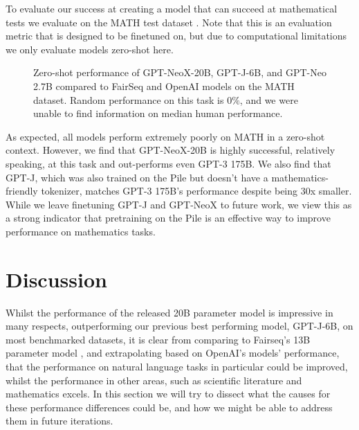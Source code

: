 \documentclass{article}
\newcommand{\model}{GPT-NeoX-20B}
\begin{document}
To evaluate our success at creating a model that can succeed at mathematical tests we evaluate on the MATH test dataset \citep{hendrycks2021measuring}. Note that this is an evaluation metric that is designed to be finetuned on, but due to computational limitations we only evaluate models zero-shot here.

\begin{figure}
    \centering
    \pgfplotsset{width=0.49\linewidth}
    
    \caption{Zero-shot performance of \model{}, GPT-J-6B, and GPT-Neo 2.7B compared to FairSeq and OpenAI models on the MATH dataset. Random performance on this task is $0\%$, and we were unable to find information on median human performance.}
    \label{fig:my_label}
\end{figure}


As expected, all models perform extremely poorly on MATH in a zero-shot context. However, we find that \model{} is highly successful, relatively speaking, at this task and out-performs even GPT-3 175B. We also find that GPT-J, which was also trained on the Pile but doesn't have a mathematics-friendly tokenizer, matches GPT-3 175B's performance despite being 30x smaller. While we leave finetuning GPT-J and GPT-NeoX to future work, we view this as a strong indicator that pretraining on the Pile is an effective way to improve performance on mathematics tasks.

\section{Discussion}

Whilst the performance of the released 20B parameter model is impressive in many respects, outperforming our previous best performing model, GPT-J-6B, on most benchmarked datasets, it is clear from comparing to Fairseq's 13B parameter model \citep{fairseq-13B}, and extrapolating based on OpenAI's models' performance, that the performance on natural language tasks in particular could be improved, whilst the performance in other areas, such as scientific literature and mathematics excels. In this section we will try to dissect what the causes for these performance differences could be, and how we might be able to address them in future iterations. 
\end{document}
